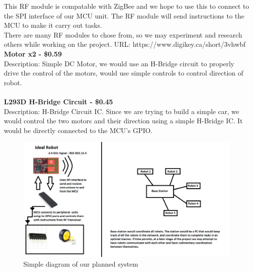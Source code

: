 \documentclass[a4paper]{article}
\begin{document}
	This RF module is compatable with ZigBee and we hope to use this to connect to the SPI interface of our MCU unit. The RF module will send instructions to the MCU to make it carry out tasks. \\
	
	There are many RF modules to chose from, so we may experiment and research others while working on the project.
	URL: https://www.digikey.ca/short/3vhwbf \\
	
	
	\textbf{Motor x2 - \$0.59} \\
	Description: Simple DC Motor, we would use an H-Bridge circuit to properly drive the control of the motors, would use simple controls to control direction of robot. \\ \\
	
	\textbf{L293D H-Bridge Circuit - \$0.45} \\
	Description: H-Bridge Circuit IC. Since we are trying to build a simple car, we would control the two motors and their direction using a simple H-Bridge IC. It would be directly connected to the MCU's GPIO. \\
	\begin{figure}[h]
		\includegraphics[scale=0.5]{../diag.png}
		\caption{Simple diagram of our planned system}
	\end{figure}
	
	
\end{document}
